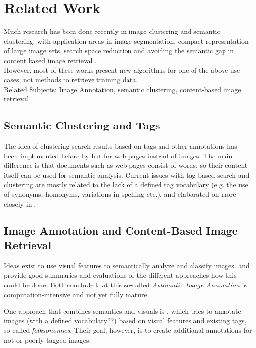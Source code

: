 \section{Related Work}
\label{sec_relatedwork}

Much research has been done recently in image clustering and semantic clustering, with application areas in image segmentation, compact representation of large image sets, search space reduction and avoiding the semantic gap in content based image retrieval \cite{Lim2011}. \\
However, most of these works present new algorithms for one of the above use cases, not methods to retrieve training data. \\

Related Subjects: Image Annotation, semantic clustering, content-based image retrieval

\subsection{Semantic Clustering and Tags}
The idea of clustering search results based on tags and other annotations has been implemented before by \cite{Ramage2009} but for web pages instead of images. The main difference is that documents such as web pages consist of words, so their content itself can be used for semantic analysis.
Current issues with tag-based search and clustering are mostly related to the lack of a defined tag vocabulary (e.g. the use of synonyms, homonyms, variations in spelling etc.), and elaborated on more closely in \cite{Auer2011}.

\subsection{Image Annotation and Content-Based Image Retrieval}

Ideas exist to use visual features to semantically analyze and classify images. \cite{Liu2007} and \cite{Zhang2012} provide good summaries and evaluations of the different approaches how this could be done. Both conclude that this so-called \emph{Automatic Image Annotation}  is computation-intensive and not yet fully mature.


One approach that combines semantics and visuals is \cite{Lindstaedt2009}, which tries to annotate images (with a defined vocabulary??) based on visual features and existing tags, so-called \emph{folksonomies}. Their goal, however, is to create additional annotations for not or poorly tagged images.